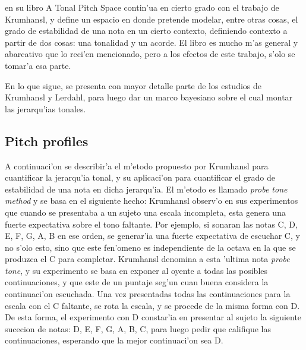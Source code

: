 
\cite{Lerdahl2001} en su libro A Tonal Pitch Space contin'ua en cierto grado con el trabajo de Krumhansl, y define un espacio en donde pretende 
modelar, entre otras cosas, el grado de estabilidad de una nota en un cierto contexto, definiendo contexto a partir de dos cosas: una tonalidad y un acorde. 
El libro es mucho m'as general y abarcativo que lo reci'en mencionado, pero a los efectos de este trabajo, s'olo se tomar'a esa parte.

En lo que sigue, se presenta con mayor detalle parte de los estudios de Krumhansl y Lerdahl, para luego dar un marco bayesiano sobre el cual montar las jerarqu'ias tonales.

\subsection{Pitch profiles}
\label{sec:pitch_profile}
A continuaci'on se describir'a el m'etodo propuesto por Krumhansl para cuantificar la jerarqu'ia tonal, y su aplicaci'on para cuantificar el grado de estabilidad 
de una nota en dicha jerarqu'ia. 
El m'etodo es llamado \emph{probe tone method} y se basa en el siguiente hecho: Krumhansl observ'o en sus experimentos que cuando se presentaba a un sujeto una escala 
incompleta, esta genera una fuerte expectativa sobre el tono faltante. Por ejemplo, si sonaran las notas C, D, E, F, G, A, B en ese orden, se generar'ia una fuerte 
expectativa de escuchar C, y no s'olo esto, sino que este fen'omeno es independiente de la octava en la que se produzca el C para completar.
Krumhansl denomina a esta 'ultima nota \emph{probe tone}, y su experimento se basa en exponer al oyente a todas las posibles continuaciones, y que este de un puntaje
seg'un cuan buena considera la continuaci'on escuchada. Una vez presentadas todas las continuaciones para la escala con el C faltante, se rota la escala, y se procede
de la misma forma con D. De esta forma, el experimento con D constar'ia en presentar al sujeto la siguiente sucecion de notas: D, E, F, G, A, B, C, para luego pedir
que califique las continuaciones, esperando que la mejor continuaci'on sea D.

